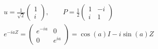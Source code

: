 \documentclass{article}
\begin{document}
\newpage
\null\vfill\[\begin{gathered}
u=\frac1{\sqrt2}\begin{pmatrix}1\\i\end{pmatrix},\qquad P=\frac12\begin{pmatrix}1&-i\\i&1\end{pmatrix}\\[12pt]e^{-iaZ}=\begin{pmatrix}e^{-ia}&0\\0&e^{ia}\end{pmatrix}=\cos(a)I-i\sin(a)Z
\end{gathered}\]\vfill\null
\newpage
\end{document}
